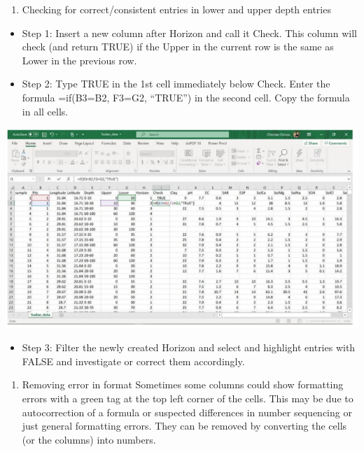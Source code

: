 \documentclass[
  10pt,
  b5paper,
]{book}
\providecommand{\tightlist}{%
  \setlength{\itemsep}{0pt}\setlength{\parskip}{0pt}}
\begin{document}
\begin{enumerate}
\def\labelenumi{\arabic{enumi}.}
\setcounter{enumi}{1}
\tightlist
\item
  Checking for correct/consistent entries in lower and upper depth entries
\end{enumerate}

\begin{itemize}
\tightlist
\item
  Step 1: Insert a new column after Horizon and call it Check. This column will check (and return TRUE) if the Upper in the current row is the same as Lower in the previous row.
\item
  Step 2: Type TRUE in the 1st cell immediately below Check. Enter the formula =if(B3=B2, F3=G2, ``TRUE'') in the second cell. Copy the formula in all cells.
\end{itemize}

\includegraphics{figures/images/FigureA4.PNG}

\begin{itemize}
\tightlist
\item
  Step 3: Filter the newly created Horizon and select and highlight entries with FALSE and investigate or correct them accordingly.
\end{itemize}

\begin{enumerate}
\def\labelenumi{\arabic{enumi}.}
\setcounter{enumi}{2}
\tightlist
\item
  Removing error in format
  Sometimes some columns could show formatting errors with a green tag at the top left corner of the cells. This may be due to autocorrection of a formula or suspected differences in number sequencing or just general formatting errors. They can be removed by converting the cells (or the columns) into numbers.
\end{enumerate}
\end{document}
